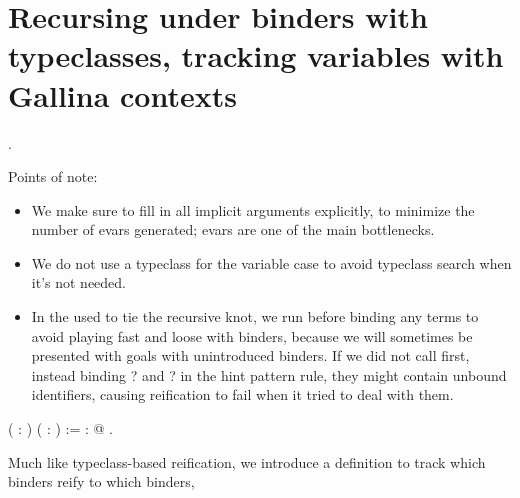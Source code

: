 \begin{coqdoccode}
\end{coqdoccode}
\section{Recursing under binders with typeclasses, tracking variables with Gallina contexts}

\begin{coqdoccode}
\coqdocnoindent
{}  .\coqdoceol
\coqdocemptyline
\end{coqdoccode}
Points of note:



\begin{itemize}
\item  We make sure to fill in all implicit arguments explicitly, to
      minimize the number of evars generated; evars are one of the
      main bottlenecks.



\item  We do not use a typeclass for the variable case to avoid
      typeclass search when it's not needed.



\item  In the  used to tie the recursive knot, we run 
      before binding any terms to avoid playing fast and loose with
      binders, because we will sometimes be presented with goals with
      unintroduced binders.  If we did not call  first,
      instead binding ? and ? in the hint pattern rule,
      they might contain unbound identifiers, causing reification to
      fail when it tried to deal with them. 
\end{itemize}
\begin{coqdoccode}
\coqdocemptyline
\coqdocnoindent
{}  ( : ) ( : ) :=  : @ .\coqdoceol
\coqdocemptyline
\end{coqdoccode}
Much like typeclass-based reification, we introduce a definition
    to track which  binders reify to which  binders,
